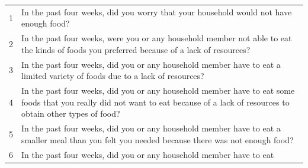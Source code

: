 \documentclass[12pt,]{book}
\theoremstyle{definition}
\theoremstyle{definition}
\theoremstyle{definition}
\theoremstyle{remark}
\begin{document}
\begin{longtable}[]{@{}ll@{}}
\toprule
\begin{minipage}[t]{0.11\columnwidth}\raggedright
1\strut
\end{minipage} & \begin{minipage}[t]{0.83\columnwidth}\raggedright
In the past four weeks, did you worry that your household would not have
enough food?\strut
\end{minipage}\tabularnewline
\begin{minipage}[t]{0.11\columnwidth}\raggedright
2\strut
\end{minipage} & \begin{minipage}[t]{0.83\columnwidth}\raggedright
In the past four weeks, were you or any household member not able to eat
the kinds of foods you preferred because of a lack of resources?\strut
\end{minipage}\tabularnewline
\begin{minipage}[t]{0.11\columnwidth}\raggedright
3\strut
\end{minipage} & \begin{minipage}[t]{0.83\columnwidth}\raggedright
In the past four weeks, did you or any household member have to eat a
limited variety of foods due to a lack of resources?\strut
\end{minipage}\tabularnewline
\begin{minipage}[t]{0.11\columnwidth}\raggedright
4\strut
\end{minipage} & \begin{minipage}[t]{0.83\columnwidth}\raggedright
In the past four weeks, did you or any household member have to eat some
foods that you really did not want to eat because of a lack of resources
to obtain other types of food?\strut
\end{minipage}\tabularnewline
\begin{minipage}[t]{0.11\columnwidth}\raggedright
5\strut
\end{minipage} & \begin{minipage}[t]{0.83\columnwidth}\raggedright
In the past four weeks, did you or any household member have to eat a
smaller meal than you felt you needed because there was not enough
food?\strut
\end{minipage}\tabularnewline
\begin{minipage}[t]{0.11\columnwidth}\raggedright
6\strut
\end{minipage} & \begin{minipage}[t]{0.83\columnwidth}\raggedright
In the past four weeks, did you or any household member have to eat

\end{minipage}
\end{longtable}
\end{document}

